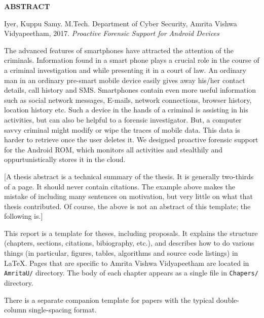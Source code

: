 \newpage
\thispagestyle{plain}

{\centering\bf ABSTRACT\\}\par\vskip 2cm

\singleSpacing

\noindent
Iyer, Kuppu Samy. %
M.Tech.  Department of Cyber Security,
Amrita Vishwa Vidyapeetham,
2017.                           %
{\sl Proactive Forensic Support for Android Devices} %

\par\vskip 1cm

\doubleSpacing

The advanced features of smartphones have attracted the attention of
the criminals.  Information found in a smart phone plays a crucial
role in the course of a criminal investigation and while presenting it
in a court of law.  An ordinary man in an ordinary pre-smart mobile
device easily gives away his/her contact details, call history and
SMS.  Smartphones contain even more useful information such as social
network messages, E-mails, network connections, browser history,
location history etc.  Such a device in the hands of a criminal is
assisting in his activities, but can also be helpful to a forensic
investigator.  But, a computer savvy criminal might modify or wipe the
traces of mobile data.  This data is harder to retrieve once the user
deletes it.  We designed proactive forensic support for the Android
ROM, which monitors all activities and stealthily and
oppurtunistically stores it in the cloud.

[A thesis abstract is a technical summary of the thesis.  It is
generally two-thirds of a page.  It should never contain citations.
The example above makes the mistake of including many sentences on
motivation, but very little on what that thesis contributed.  Of
course, the above is not an abstract of this template; the following
is.]

This report is a template for theses, including proposals.  It
explains the structure (chapters, sections, citations, bibiography,
etc.), and describes how to do various things (in particular, figures,
tables, algorithms and source code listings) in \LaTeX{}.  Pages that
are specific to Amrita Vishwa Vidyapeetham are located in {\tt
AmritaU/} directory.  The body of each chapter appears as a single
file in {\tt Chapers/} directory.

There is a separate companion template for papers with the typical
double-column single-spacing format.

